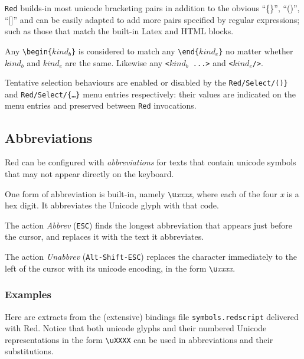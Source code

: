 \documentclass[11pt,a4paper]{article}
\begin{document}
\texttt{Red} builds-in most unicode bracketing pairs in addition to the
obvious ``\{\}'', ``()'', ``{[}{]}'' and can be easily adapted to add
more pairs specified by regular expressions; such as those that match
the built-in Latex and HTML blocks.

Any \verb/\begin{/$kind_b$\verb/}/ is considered to match
any \verb/\end{/$kind_e$\verb/}/
no matter whether $kind_b$ and $kind_e$ are the same. Likewise
any \verb/</$kind_b$\verb/ ...>/ and \verb/</$kind_e$\verb|/>|.

Tentative selection behaviours are enabled or disabled by the
\texttt{Red/Select/(\ldots@)\}} and
\texttt{Red/Select/\{\ldots\}} menu entries respectively: their values are
indicated on the menu entries and preserved between \texttt{Red} invocations.

\hypertarget{abbreviations}{%
\subsection{Abbreviations}\label{abbreviations}}

Red can be configured with \emph{abbreviations} for texts that contain
unicode symbols that may not appear directly on the keyboard.

One form of abbreviation is built-in, namely
\texttt{\textbackslash{}u}\emph{xxxx}, where each of the four \emph{x}
is a hex digit. It abbreviates the Unicode glyph with that code.

The action \emph{Abbrev} (\texttt{ESC}) finds the longest abbreviation
that appears just before the cursor, and replaces it with the text it
abbreviates.

The action \emph{Unabbrev} (\texttt{Alt-Shift-ESC}) replaces the
character immediately to the left of the cursor with its unicode
encoding, in the form \texttt{\textbackslash{}u}\emph{xxxx}.

\hypertarget{examples-of-abbreviations}{%
\subsubsection{Examples}\label{examples-of-abbreviations}}

Here are extracts from the (extensive) bindings file
\texttt{symbols.redscript} delivered with Red. Notice that both
unicode glyphs and their numbered Unicode representations in the
form \texttt{\textbackslash{}uXXXX} can be used in abbreviations
and their substitutions.
\end{document}
